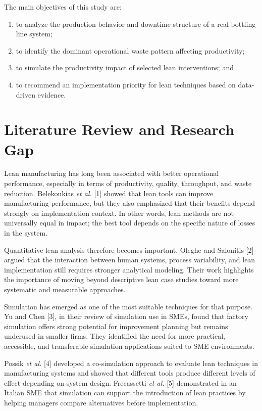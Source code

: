\documentclass[12pt,a4paper]{article}
\begin{document}
The main objectives of this study are:
\begin{enumerate}
    \item to analyze the production behavior and downtime structure of a real bottling-line system;
    \item to identify the dominant operational waste pattern affecting productivity;
    \item to simulate the productivity impact of selected lean interventions; and
    \item to recommend an implementation priority for lean techniques based on data-driven evidence.
\end{enumerate}

\section{Literature Review and Research Gap}
Lean manufacturing has long been associated with better operational performance, especially in terms of productivity, quality, throughput, and waste reduction. Belekoukias \emph{et al.} [1] showed that lean tools can improve manufacturing performance, but they also emphasized that their benefits depend strongly on implementation context. In other words, lean methods are not universally equal in impact; the best tool depends on the specific nature of losses in the system.

Quantitative lean analysis therefore becomes important. Oleghe and Salonitis [2] argued that the interaction between human systems, process variability, and lean implementation still requires stronger analytical modeling. Their work highlights the importance of moving beyond descriptive lean case studies toward more systematic and measurable approaches.

Simulation has emerged as one of the most suitable techniques for that purpose. Yu and Chen [3], in their review of simulation use in SMEs, found that factory simulation offers strong potential for improvement planning but remains underused in smaller firms. They identified the need for more practical, accessible, and transferable simulation applications suited to SME environments.

Possik \emph{et al.} [4] developed a co-simulation approach to evaluate lean techniques in manufacturing systems and showed that different tools produce different levels of effect depending on system design. Frecassetti \emph{et al.} [5] demonstrated in an Italian SME that simulation can support the introduction of lean practices by helping managers compare alternatives before implementation.
\end{document}
